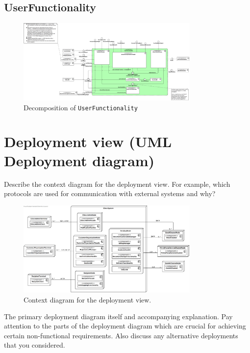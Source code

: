 \documentclass[a4paper,10pt]{article}
\begin{document}
\subsection{UserFunctionality}\label{subsec:decomp-UserFunctionality}
\begin{figure}[!htp]
	\centering
	\includegraphics[width=0.8\textwidth]{UserFunctionality.png}
	\caption{Decomposition of \texttt{UserFunctionality}}
	\label{fig:decomp-UserFunctionality}
\end{figure}
\FloatBarrier

\section{Deployment view (UML Deployment diagram)}\label{sec:deployment}
Describe the context diagram for the deployment view.
For example, which protocols are used for communication with external systems
and why?

\begin{figure}[!htp]
	\centering
	\includegraphics[width=0.8\textwidth]{ContextDeployment.png}
    \caption{Context diagram for the deployment view.}
    \label{fig:depl_context}
\end{figure}
\FloatBarrier

The primary deployment diagram itself and accompanying explanation.
Pay attention to the parts of the deployment diagram which are crucial for
achieving certain non-functional requirements.
Also discuss any alternative deployments that you considered.
\end{document}
